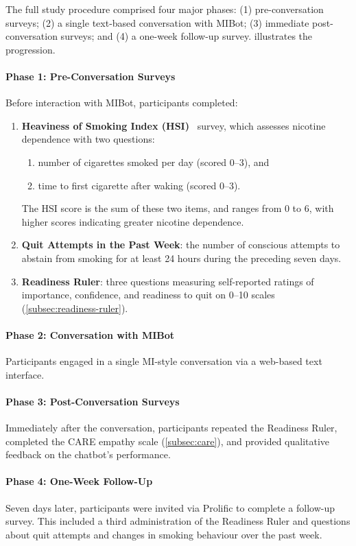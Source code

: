 The full study procedure comprised four major phases: (1) pre-conversation surveys; (2) a single text-based conversation with MIBot; (3) immediate post-conversation surveys; and (4) a one-week follow-up survey.  illustrates the progression.

\paragraph{Phase 1: Pre-Conversation Surveys}
Before interaction with MIBot, participants completed:
\begin{enumerate}
    \item \textbf{Heaviness of Smoking Index (HSI)}~\citep{heatherton1989measuring} survey, which assesses nicotine dependence with two questions:
        \begin{enumerate}
            \item number of cigarettes smoked per day (scored 0--3), and
            \item time to first cigarette after waking (scored 0--3).
        \end{enumerate}
    The HSI score is the sum of these two items, and ranges from 0 to 6, with higher scores indicating greater nicotine dependence.
    \item \textbf{Quit Attempts in the Past Week}: the number of conscious attempts to abstain from smoking for at least 24 hours during the preceding seven days.
    \item \textbf{Readiness Ruler}: three questions measuring self-reported ratings of importance, confidence, and readiness to quit on 0--10 scales (\cref{subsec:readiness-ruler}).
\end{enumerate}

\paragraph{Phase 2: Conversation with MIBot}
Participants engaged in a single MI-style conversation via a web-based text interface.

\paragraph{Phase 3: Post-Conversation Surveys}
Immediately after the conversation, participants repeated the Readiness Ruler, completed the CARE empathy scale (\cref{subsec:care}), and provided qualitative feedback on the chatbot's performance.

\paragraph{Phase 4: One-Week Follow-Up}
Seven days later, participants were invited via Prolific to complete a follow-up survey. This included a third administration of the Readiness Ruler and questions about quit attempts and changes in smoking behaviour over the past week.

